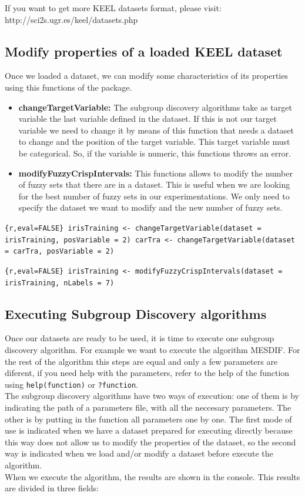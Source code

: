 \documentclass[]{article}
\begin{document}
If you want to get more KEEL datasets format, please visit:
http://sci2s.ugr.es/keel/datasets.php

\subsection{Modify properties of a loaded KEEL
dataset}\label{modify-properties-of-a-loaded-keel-dataset}

Once we loaded a dataset, we can modify some characteristics of its
properties using this functions of the package.

\begin{itemize}
  \item \textbf{changeTargetVariable:} The subgroup discovery algorithms take as target variable the last variable defined in the dataset. If this is not our target variable we need to change it by means of this function that needs a dataset to change and the position of the target variable. This target variable must be categorical. So, if the variable is numeric, this functions throws an error.

  \item \textbf{modifyFuzzyCrispIntervals:} This functions allows to modify the number of fuzzy sets that there are in a dataset. This is useful when we are looking for the best number of fuzzy sets in our experimentations. We only need to specify the dataset we want to modify and the new number of fuzzy sets.
  \end{itemize}

\texttt{\{r,eval=FALSE\} irisTraining \textless{}- changeTargetVariable(dataset = irisTraining, posVariable = 2) carTra \textless{}- changeTargetVariable(dataset = carTra, posVariable = 2)}

\texttt{\{r,eval=FALSE\} irisTraining \textless{}- modifyFuzzyCrispIntervals(dataset = irisTraining, nLabels = 7)}

\subsection{Executing Subgroup Discovery
algorithms}\label{executing-subgroup-discovery-algorithms}

Once our datasets are ready to be used, it is time to execute one
subgroup discovery algorithm. For example we want to execute the
algorithm MESDIF. For the rest of the algorithm this steps are equal and
only a few parameters are diferent, if you need help with the
parameters, refer to the help of the function using
\texttt{help(function)} or \texttt{?function}.\\The subgroup discovery
algorithms have two ways of execution: one of them is by indicating the
path of a parameters file, with all the neccesary parameters. The other
is by putting in the function all parameters one by one. The first mode
of use is indicated when we have a dataset prepared for executing
directly because this way does not allow us to modify the properties of
the dataset, so the second way is indicated when we load and/or modify a
dataset before execute the algorithm.\\When we execute the algorithm,
the results are shown in the console. This results are divided in three
fields:
\end{document}
